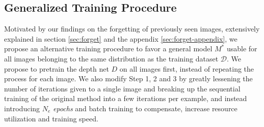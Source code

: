 \subsection{Generalized Training Procedure}
\label{sec:method-general}
Motivated by our findings on the forgetting of previously seen images, extensively explained in section \ref{sec:forget} and the appendix \ref{sec:forget-appendix}, we propose an alternative training procedure to favor a general model %
$M^*$ usable for all images belonging to the same distribution as the training dataset $\mathcal{D}$. We propose to pretrain the depth net $D$ on all images first, instead of repeating the process for each image. We also modify Step 1, 2 and 3 
by greatly lessening the number of iterations given to a single image and breaking up the sequential training of the original method into a few iterations per example, and instead introducing $N_e$ \textit{epochs} and batch training to compensate, increase resource utilization and training speed. 

